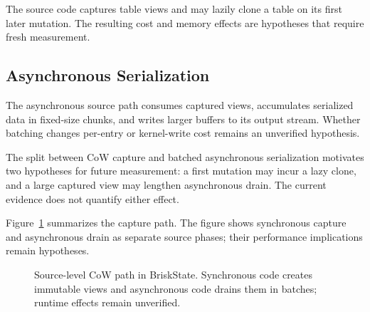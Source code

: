 \documentclass[journal]{IEEEtran}
\newcommand{\briskstate}{BriskState\xspace}
\newcommand{\system}{\briskstate}
\begin{document}
The source code captures table views and may lazily clone a table on its first later mutation. The resulting cost and memory effects are hypotheses that require fresh measurement.

\subsection{Asynchronous Serialization}

The asynchronous source path consumes captured views, accumulates serialized data in fixed-size chunks, and writes larger buffers to its output stream. Whether batching changes per-entry or kernel-write cost remains an unverified hypothesis.

The split between CoW capture and batched asynchronous serialization motivates two hypotheses for future measurement: a first mutation may incur a lazy clone, and a large captured view may lengthen asynchronous drain. The current evidence does not quantify either effect.

Figure~\ref{fig:snapshot} summarizes the capture path. The figure shows synchronous capture and asynchronous drain as separate source phases; their performance implications remain hypotheses.

\begin{figure}[t]
\centering
{}
\caption{Source-level CoW path in \system. Synchronous code creates immutable views and asynchronous code drains them in batches; runtime effects remain unverified.}
\label{fig:snapshot}
\end{figure}
\end{document}
